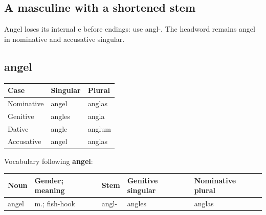 \subsection*{A masculine with a shortened stem}

Angel loses its internal e before endings: use angl-. The headword remains angel in nominative and accusative singular.

\subsection*{angel}

\par\begingroup
\fontsize{10.5}{13.2}\selectfont
\setlength{\LTleft}{0pt}\setlength{\LTright}{\fill}
\noindent
\begin{tabular}{@{}>{\raggedright\arraybackslash}p{39.46mm}>{\raggedright\arraybackslash}p{39.46mm}>{\raggedright\arraybackslash}p{39.46mm}@{}}
\toprule
\textbf{Case} & \textbf{Singular} & \textbf{Plural} \\
\midrule
Nominative & angel & anglas \\
Genitive & angles & angla \\
Dative & angle & anglum \\
Accusative & angel & anglas \\
\bottomrule
\end{tabular}
\par\endgroup

Vocabulary following \textbf{angel}:

\par\begingroup
\fontsize{10.5}{13.2}\selectfont
\setlength{\LTleft}{0pt}\setlength{\LTright}{\fill}
\noindent
\begin{tabular}{@{}>{\raggedright\arraybackslash}p{19.82mm}>{\raggedright\arraybackslash}p{23.18mm}>{\raggedright\arraybackslash}p{19.82mm}>{\raggedright\arraybackslash}p{23.88mm}>{\raggedright\arraybackslash}p{26.06mm}@{}}
\toprule
\textbf{Noun} & \textbf{Gender; meaning} & \textbf{Stem} & \textbf{Genitive singular} & \textbf{Nominative plural} \\
\midrule
angel & m.; fish-hook & angl- & angles & anglas \\
\bottomrule
\end{tabular}
\par\endgroup

